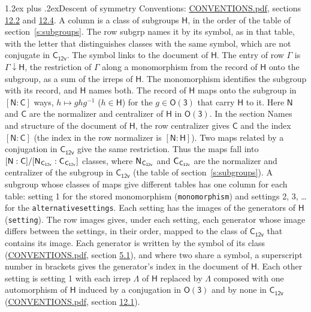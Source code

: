 \documentclass[10pt,a4paper]{article}
\makeatletter
\renewcommand\section{\@startsection{section}{1}{\z@}{-3ex plus -1ex minus -.2ex}%
  {1.2ex plus .2ex}{\normalfont\large\sffamily\bfseries\color{parttitle}}}
\numberwithin{equation}{section}
\newcommand{\grp}[1]{\mathsf{#1}}
\newcommand{\grpindex}[2]{[#1 : #2]}
\newcommand{\restr}[2]{#1\!\downarrow#2}
\newcommand{\hairsp}{\mkern1mu}
\makeatother
\begin{document}
\section{Descent of symmetry}\label{s:subduction}
Conventions: \href{../../CONVENTIONS.pdf}{CONVENTIONS.pdf}, sections \href{../../CONVENTIONS.pdf\#conv.12.2}{12.2} and \href{../../CONVENTIONS.pdf\#conv.12.4}{12.4}.
A column is a class of subgroups $\grp{H}$, in the order of the table of section~\ref{s:subgroups}. The row subgrp names it by its symbol, as in that table, with the letter that distinguishes classes with the same symbol, which are not conjugate in $\grp{C_{12v}}$. The symbol links to the document of $\grp{H}$. The entry of row $\Gamma$ is $\restr{\Gamma}{\grp{H}}$, the restriction of $\Gamma$ along a monomorphism from the record of $\grp{H}$ onto the subgroup, as a sum of the irreps of $\grp{H}$. The monomorphism identifies the subgroup with its record, and $\grp{H}$ names both. \label{n:group.normalizer.o3}\label{n:group.centralizer.o3}The record of $\grp{H}$ maps onto the subgroup in $\grpindex{\grp{N}}{\grp{C}}$ ways, $h \mapsto g h g^{-1}$ ($h \in \grp{H}$) for the $g \in \grp{O(3)}$ that carry $\grp{H}$ to it. Here $\grp{N}$ and $\grp{C}$ are the normalizer and centralizer of $\grp{H}$ in \href{O3.pdf}{$\grp{O(3)}$}. In the section Names and structure of the document of $\grp{H}$, the row centralizer gives $\grp{C}$ and the index $\grpindex{\grp{N}}{\grp{C}}$ (the index in the row normalizer is $\grpindex{\grp{N}}{\grp{H}}$). Two maps related by a conjugation in $\grp{C_{12v}}$ give the same restriction. Thus the maps fall into $\grpindex{\grp{N}}{\grp{C}}/\grpindex{\grp{N}_{\hairsp \grp{C_{12v}}}}{\grp{C}_{\hairsp \grp{C_{12v}}}}$ classes, where $\grp{N}_{\hairsp \grp{C_{12v}}}$ and $\grp{C}_{\hairsp \grp{C_{12v}}}$ are the normalizer and centralizer of the subgroup in $\grp{C_{12v}}$ (the table of section~\ref{s:subgroups}). \label{n:head.setting}A subgroup whose classes of maps give different tables has one column for each table: setting 1 for the stored monomorphism (\texttt{monomorphism}) and settings 2, 3, \dots{} for the \texttt{alternativesettings}. Each setting has the images of the generators of $\grp{H}$ (\texttt{setting}). \label{n:head.images}The row images gives, under each setting, each generator whose image differs between the settings, in their order, mapped to the class of $\grp{C_{12v}}$ that contains its image. Each generator is written by the symbol of its class (\href{../../CONVENTIONS.pdf}{CONVENTIONS.pdf}, section \href{../../CONVENTIONS.pdf\#conv.5.1}{5.1}), and where two share a symbol, a superscript number in brackets gives the generator's index in the document of $\grp{H}$. \label{n:irrep.Delta}Each other setting is setting 1 with each irrep $\Lambda$ of $\grp{H}$ replaced by $\Lambda$ composed with one automorphism of $\grp{H}$ induced by a conjugation in \href{O3.pdf}{$\grp{O(3)}$} and by none in $\grp{C_{12v}}$ (\href{../../CONVENTIONS.pdf}{CONVENTIONS.pdf}, section \href{../../CONVENTIONS.pdf\#conv.12.1}{12.1}).
\end{document}
